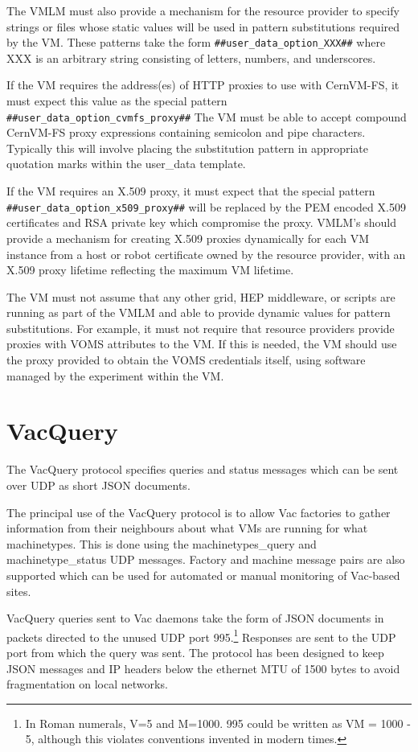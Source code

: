 \documentclass[12pt,a4paper]{article}
\begin{document}
The VMLM must also provide a mechanism for the resource provider
to specify strings or files whose static values will be used in pattern 
substitutions required by the VM. These patterns take the form
\texttt{\#\#user\_data\_option\_XXX\#\#} where XXX is an arbitrary string
consisting of letters, numbers, and underscores. 

If the VM requires the address(es) of HTTP proxies to use with CernVM-FS,
it must expect this value as the special pattern 
\texttt{\#\#user\_data\_option\_cvmfs\_proxy\#\#} The VM must be able to
accept compound CernVM-FS proxy expressions containing semicolon and pipe 
characters. Typically this will involve placing the substitution pattern
in appropriate quotation marks within the user\_data template.

If the VM requires an X.509 proxy, it must expect that the special pattern
\texttt{\#\#user\_data\_option\_x509\_proxy\#\#} will be replaced by the 
PEM encoded X.509 certificates and RSA private key which compromise the
proxy. VMLM's should provide a mechanism for creating X.509 proxies
dynamically for each VM instance from a host or robot certificate owned
by the resource provider, with an X.509 proxy lifetime reflecting
the maximum VM lifetime. 

The VM must not assume that any other grid, HEP middleware, or scripts
are running as part of the VMLM and able to provide dynamic values for
pattern substitutions. For example, it
must not require that resource providers provide proxies with VOMS
attributes to the VM. If this is needed, the VM should use
the proxy provided to obtain the VOMS credentials itself, using software 
managed by the experiment within the VM.

\section{VacQuery}
\label{sec:vacquery}

The VacQuery protocol specifies queries and status messages
which can be sent over UDP as short JSON documents.

The principal use of the VacQuery protocol is to allow Vac factories to
gather information from their neighbours about what VMs are running for
what machinetypes. This is done using the machinetypes\_query and
machinetype\_status UDP messages. Factory and machine message pairs
are also supported which can be used for automated or manual 
monitoring of Vac-based sites.

VacQuery queries sent to Vac daemons take the form of JSON documents
in packets directed to the unused UDP port 
995.\footnote{In Roman numerals, V=5 and M=1000. 995 could be written
as VM = 1000 - 5, although this violates conventions invented in 
modern times.} Responses are sent to the UDP port from which the
query was sent. The protocol has been designed to keep JSON messages and
IP headers below the ethernet MTU of 1500 bytes to avoid fragmentation
on local networks. 
\end{document}
